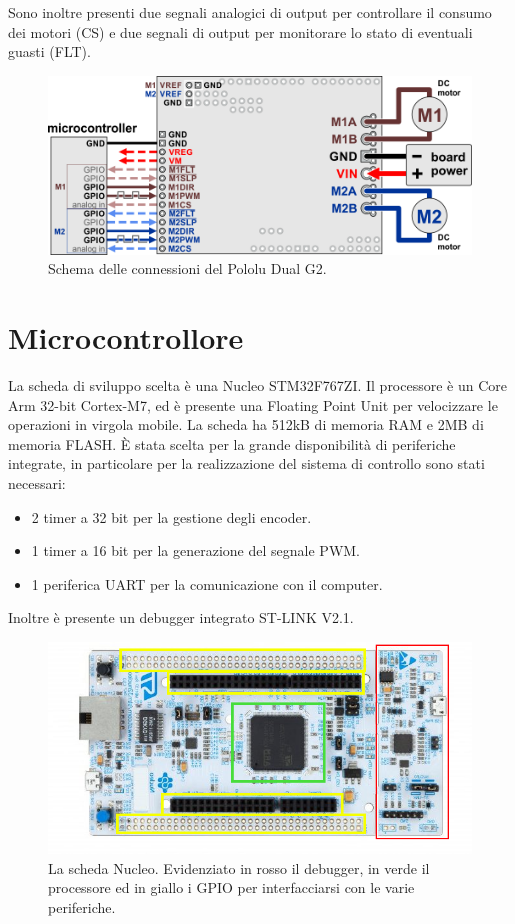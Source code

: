 Sono inoltre presenti due segnali analogici di output per controllare il consumo dei motori (CS) e due segnali di output per monitorare lo stato di eventuali guasti (FLT).

\begin{figure}[H]
\centering
\includegraphics[scale=1.4]{images/pololu.png}
\caption{Schema delle connessioni del Pololu Dual G2.}
\end{figure}


\section{Microcontrollore}
La scheda di sviluppo scelta è una Nucleo STM32F767ZI.
Il processore è un Core Arm 32-bit Cortex-M7, ed è presente una Floating Point Unit per velocizzare le operazioni in virgola mobile.
La scheda ha 512kB di memoria RAM e 2MB di memoria FLASH.
È stata scelta per la grande disponibilità di periferiche integrate, in particolare per la realizzazione del sistema di controllo sono stati necessari: 
\begin{itemize}
    \item 2 timer a 32 bit per la gestione degli encoder.
    \item 1 timer a 16 bit per la generazione del segnale PWM.
    \item 1 periferica UART per la comunicazione con il computer.
\end{itemize}
Inoltre è presente un debugger integrato ST-LINK V2.1.

\begin{figure}[H]
\centering
\includegraphics[scale=0.65]{images/nucleo.png}
\caption{La scheda Nucleo. Evidenziato in rosso il debugger, in verde il processore ed in giallo i GPIO per interfacciarsi con le varie periferiche.}
\end{figure}

